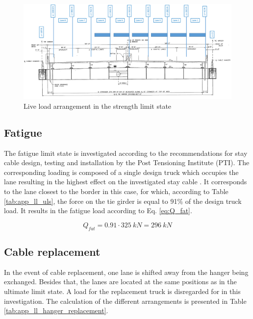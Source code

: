 \begin{figure}[H]
    \centering
    \includegraphics[width=\textwidth]{overleaf/Appendix/Pictures/Cross_Section_LL_ULS.PNG}
    \caption{Live load arrangement in the strength limit state}
    \label{fig:app_hangers_uls}
\end{figure}


\subsection*{Fatigue} \label{Appendx_A_Live_loading_15}
The fatigue limit state is investigated according to the recommendations for stay cable design, testing and installation by the Post Tensioning Institute (PTI). The corresponding loading is composed of a single design truck which occupies the lane resulting in the highest effect on the investigated stay cable \cite{PTI}. It corresponds to the lane closest to the border in this case, for which, according to Table \ref{tab:app_ll_uls}, the force on the tie girder is equal to 91\% of the design truck load. It results in the fatigue load according to Eq. \ref{eq:Q_fat}.

\begin{equation}
    Q_{fat} = 0.91 \cdot \SI{325}{kN} = \SI{296}{kN}
    \label{eq:Q_fat}
\end{equation}

\subsection*{Cable replacement} \label{Appendx_A_Live_loading_2}
In the event of cable replacement, one lane is shifted away from the hanger being exchanged. Besides that, the lanes are located at the same positions as in the ultimate limit state. A load for the replacement truck is disregarded for in this investigation. The calculation of the different arrangements is presented in Table \ref{tab:app_ll_hanger_replacement}.


